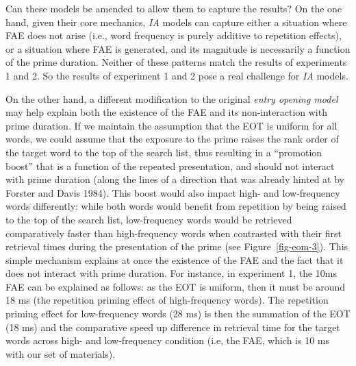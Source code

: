 \documentclass[
]{interact}
\begin{document}
Can these models be amended to allow them to capture the results? On the
one hand, given their core mechanics, \emph{IA} models can capture
either a situation where FAE does not arise (i.e., word frequency is
purely additive to repetition effects), or a situation where FAE is
generated, and its magnitude is necessarily a function of the prime
duration. Neither of these patterns match the results of experiments 1
and 2. So the results of experiment 1 and 2 pose a real challenge for
\emph{IA} models.

On the other hand, a different modification to the original \emph{entry
opening model} may help explain both the existence of the FAE and its
non-interaction with prime duration. If we maintain the assumption that
the EOT is uniform for all words, we could assume that the exposure to
the prime raises the rank order of the target word to the top of the
search list, thus resulting in a ``promotion boost'' that is a function
of the repeated presentation, and should not interact with prime
duration (along the lines of a direction that was already hinted at by
Forster and Davis 1984). This boost would also impact high- and
low-frequency words differently: while both words would benefit from
repetition by being raised to the top of the search list, low-frequency
words would be retrieved comparatively faster than high-frequency words
when contrasted with their first retrieval times during the presentation
of the prime (see Figure~\ref{fig-eom-3}). This simple mechanism
explains at once the existence of the FAE and the fact that it does not
interact with prime duration. For instance, in experiment 1, the 10ms
FAE can be explained as follows: as the EOT is uniform, then it must be
around 18 ms (the repetition priming effect of high-frequency words).
The repetition priming effect for low-frequency words (28 ms) is then
the summation of the EOT (18 ms) and the comparative speed up difference
in retrieval time for the target words across high- and low-frequency
condition (i.e, the FAE, which is 10 ms with our set of materials).
\end{document}
